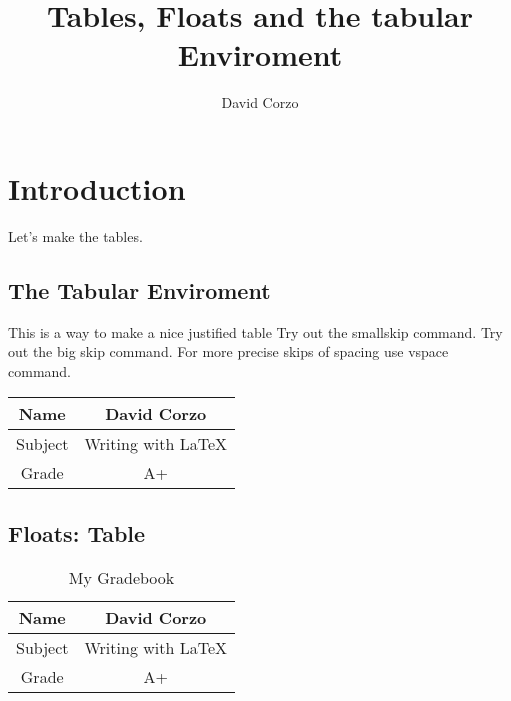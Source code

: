 \documentclass{article}
\title{Tables, Floats and the tabular Enviroment}
\author{David Corzo}
\date{}
\begin{document}
\maketitle
\section{Introduction}
Let's make the tables.



\subsection{The Tabular Enviroment}

This is a way to make a nice justified table
\smallskip \newline
Try out the smallskip command.
\bigskip \newline
Try out the big skip command.
\vspace{0.5cm}\newline
For more precise skips of spacing use vspace command.
\newline \smallskip

\begin{tabular}{|||c||c|||}
\hline \hline
Name & David Corzo \\
\hline \hline
Subject & Writing with \LaTeX \\
\hline \hline
Grade & A+ \\
\hline \hline
\end{tabular}




\subsection{Floats: Table}

\begin{table}[htbp]
\caption{My Gradebook}
\begin{center}
\begin{tabular}{|||c||c|||}
\hline \hline
Name & David Corzo \\
\hline \hline
Subject & Writing with \LaTeX \\
\hline \hline
Grade & A+ \\
\hline \hline
\end{tabular}
\end{center}
\label{tab:grades}
\end{table}
\end{document}

